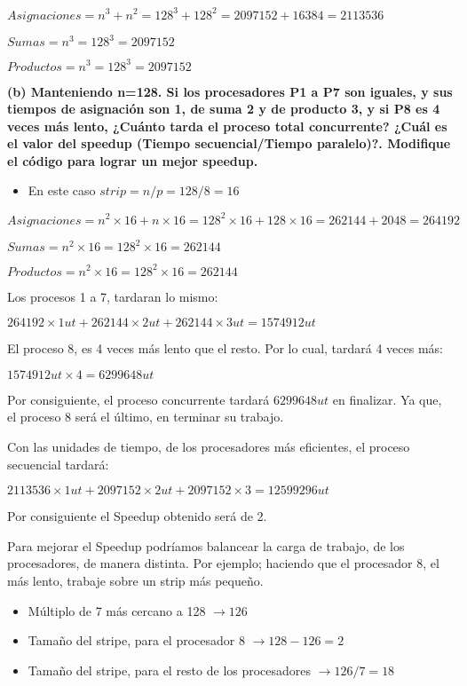 \documentclass[a4paper, 10pt]{article}
\newenvironment{QandA}{
    \begin{enumerate}\bfseries}
    {\end{enumerate}
}
\begin{document}
\begin{QandA}
$Asignaciones = n^3 + n^2 = 128^3 + 128^2 = 2097152 + 16384 = 2113536$

$Sumas = n^3 = 128^3 = 2097152$

$Productos = n^3 = 128^3 = 2097152$


\textbf{(b) Manteniendo n=128. Si los procesadores P1 a P7 son iguales, y sus tiempos de asignación son 1, de suma 2 y de producto 3, y si
P8 es 4 veces más lento, ¿Cuánto tarda el proceso total concurrente? ¿Cuál es el valor del speedup (Tiempo
secuencial/Tiempo paralelo)?. Modifique el código para lograr un mejor speedup.}

\begin{itemize}
    \item En este caso $strip = n/p = 128/8 = 16$
\end{itemize}

$Asignaciones = n^2 \times 16 + n \times 16 = 128^2 \times 16 + 128 \times 16 = 262144 + 2048 = 264192$

$Sumas = n^2 \times 16 = 128^2 \times 16 = 262144$

$Productos = n^2 \times 16 = 128^2 \times 16 = 262144$

Los procesos 1 a 7, tardaran lo mismo:

$264192 \times 1 ut + 262144 \times 2 ut + 262144 \times 3 ut = 1574912 ut$

El proceso 8, es 4 veces más lento que el resto. Por lo cual, tardará 4 veces más:

$1574912 ut \times 4 = 6299648 ut$

Por consiguiente, el proceso concurrente tardará $6299648 ut$ en finalizar. Ya que, el proceso 8 será el último, en terminar su trabajo.

Con las unidades de tiempo, de los procesadores más eficientes, el proceso secuencial tardará:

$2113536 \times 1 ut + 2097152 \times 2 ut + 2097152 \times 3 = 12599296 ut$

Por consiguiente el Speedup obtenido será de 2.

Para mejorar el Speedup podríamos balancear la carga de trabajo, de los procesadores, de manera distinta. Por ejemplo; haciendo que el procesador 8, el más lento, trabaje sobre un strip más pequeño.

\begin{itemize}
    \item Múltiplo de 7 más cercano a 128 $\rightarrow 126$
    \item Tamaño del stripe, para el procesador 8 $\rightarrow 128 - 126 = 2$
    \item Tamaño del stripe, para el resto de los procesadores $\rightarrow 126/7 = 18$
\end{itemize}


\end{QandA}
\end{document}
